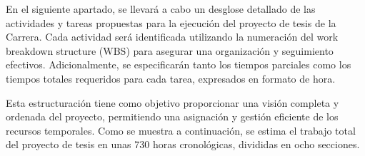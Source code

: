 %
%
%
%


\label{sec:wbs}

En el siguiente apartado, se llevará a cabo un desglose detallado de las actividades y tareas propuestas para la ejecución del proyecto de tesis de la Carrera. Cada actividad será identificada utilizando la numeración del work breakdown structure (WBS) para asegurar una organización y seguimiento efectivos. Adicionalmente, se especificarán tanto los tiempos parciales como los tiempos totales requeridos para cada tarea, expresados en formato de hora.

Esta estructuración tiene como objetivo proporcionar una visión completa y ordenada del proyecto, permitiendo una asignación y gestión eficiente de los recursos temporales. Como se muestra a continuación, se estima el trabajo total del proyecto de tesis en unas 730 horas cronológicas, divididas en ocho secciones.



